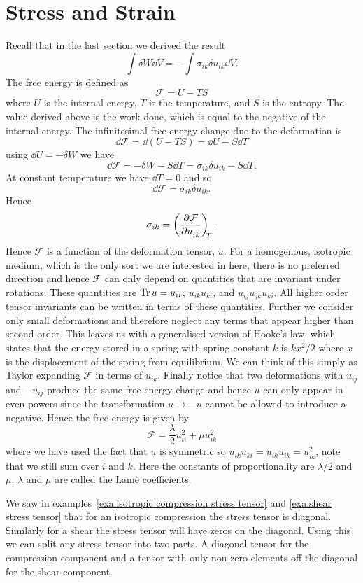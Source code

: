 \documentclass[a4paper]{article}
\newcommand{\freeEnergy}{\mathcal{F}}
\begin{document}
    \section{Stress and Strain}
    Recall that in the last section we derived the result
    \[\int\delta W\dd{V} = -\int\sigma_{ik}\delta u_{ik}\dd{V}.\]
    The free energy is defined as
    \[\freeEnergy = U - TS\]
    where \(U\) is the internal energy, \(T\) is the temperature, and \(S\) is the entropy.
    The value derived above is the work done, which is equal to the negative of the internal energy.
    The infinitesimal free energy change due to the deformation is
    \[\dd{\freeEnergy} = \dd{(U - TS)} = \dd{U} - S\dd{T}\]
    using \(\dd{U} = -\delta W\) we have
    \[\dd{\freeEnergy} = -\delta W - S\dd{T} = \sigma_{ik}\delta u_{ik} - S\dd{T}.\]
    At constant temperature we have \(\dd{T} = 0\) and so
    \[\dd{\freeEnergy} = \sigma_{ik}\delta u_{ik}.\]
    Hence
    \[\sigma_{ik} = \pdvconst{\freeEnergy}{u_{ik}}{T}.\]
    Hence \(\freeEnergy\) is a function of the deformation tensor, \(u\).
    For a homogenous, isotropic medium, which is the only sort we are interested in here, there is no preferred direction and hence \(\freeEnergy\) can only depend on quantities that are invariant under rotations.
    These quantities are \(\Tr u = u_{ii}\), \(u_{ik}u_{ki}\), and \(u_{ij}u_{jk}u_{ki}\).
    All higher order tensor invariants can be written in terms of these quantities.
    Further we consider only small deformations and therefore neglect any terms that appear higher than second order.
    This leaves us with a generalised version of Hooke's law, which states that the energy stored in a spring with spring constant \(k\) is \(kx^2/2\) where \(x\) is the displacement of the spring from equilibrium.
    We can think of this simply as Taylor expanding \(\freeEnergy\) in terms of \(u_{ik}\).
    Finally notice that two deformations with \(u_{ij}\) and \(-u_{ij}\) produce the same free energy change and hence \(u\) can only appear in even powers since the transformation \(u \to -u\) cannot be allowed to introduce a negative.
    Hence the free energy is given by
    \[\freeEnergy = \frac{\lambda}{2}u_{ii}^2 + \mu u_{ik}^2\]
    where we have used the fact that \(u\) is symmetric so \(u_{ik}u_{ki} = u_{ik}u_{ik} = u_{ik}^2\), note that we still sum over \(i\) and \(k\).
    Here the constants of proportionality are \(\lambda/2\) and \(\mu\).
    \(\lambda\) and \(\mu\) are called the Lam\`e coefficients.
    
    We saw in examples~\ref{exa:isotropic compression stress tensor} and \ref{exa:shear stress tensor} that for an isotropic compression the stress tensor is diagonal.
    Similarly for a shear the stress tensor will have zeros on the diagonal.
    Using this we can split any stress tensor into two parts.
    A diagonal tensor for the compression component and a tensor with only non-zero elements off the diagonal for the shear component.
    
\end{document}
